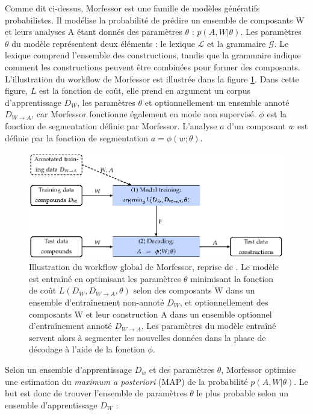 \documentclass[12pt,a4paper,times,twoside,openright]{report}
\begin{document}
Comme dit ci-dessus, Morfessor est une famille de modèles génératifs probabilistes. Il modélise la probabilité de prédire un ensemble de composants W et leurs analyses A étant donnés des paramètres $\theta$ : $p(A, W | \theta)$. Les paramètres $\theta$ du modèle représentent deux éléments : le lexique $\mathcal{L}$ et la grammaire $\mathcal{G}$. Le lexique comprend l'ensemble des constructions, tandis que la grammaire indique comment les constructions peuvent être combinées pour former des composants. L'illustration du workflow de Morfessor est illustrée dans la figure \ref{fig:morfessor-workflow}. Dans cette figure, $L$ est la fonction de coût, elle prend en argument un corpus d'apprentissage $D_{W}$, les paramètres $\theta$ et optionnellement un ensemble annoté $D_{W \rightarrow A}$, car Morfessor fonctionne également en mode non supervisé. $\phi$ est la fonction de segmentation définie par Morfessor. L'analyse $a$ d'un composant $w$ est définie par la fonction de segmentation $a = \phi(w;\theta)$.

\begin{figure}[ht!]
\centering
\includegraphics[scale=1.0]{images/morfessor/morfessor-workflow}
\caption{Illustration du workflow global de Morfessor, reprise de \citet{virpioja2013morfessor}. Le modèle est entraîné en optimisant les paramètres $\theta$ minimisant la fonction de coût $L(D_{W}, D_{W \rightarrow A}, \theta)$ selon des composants W dans un ensemble d'entraînement non-annoté $D_{W}$, et optionnellement des composants W et leur construction A dans un ensemble optionnel d'entraînement annoté $D_{W \rightarrow A}$. Les paramètres du modèle entraîné servent alors à segmenter les nouvelles données dans la phase de décodage à l'aide de la fonction $\phi$.}
\label{fig:morfessor-workflow}
\end{figure}

Selon un ensemble d'apprentissage $D_{w}$ et des paramètres $\theta$, Morfessor optimise une estimation du \emph{maximum a posteriori} (MAP) de la probabilité $p(A, W | \theta)$. Le but est donc de trouver l'ensemble de paramètres $\theta$ le plus probable selon un ensemble d'apprentissage $D_{W}$ :
\end{document}
